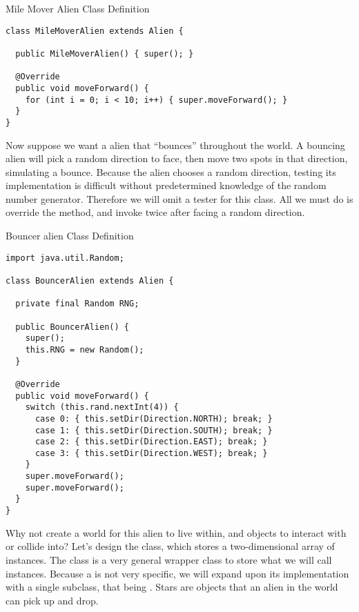 \begin{cl}{Mile Mover Alien Class Definition}
\begin{lstlisting}[language=MyJava]
class MileMoverAlien extends Alien {

  public MileMoverAlien() { super(); }

  @Override
  public void moveForward() {
    for (int i = 0; i < 10; i++) { super.moveForward(); }
  }
}
\end{lstlisting}
\end{cl}

Now suppose we want a alien that ``bounces'' throughout the world. A bouncing alien will pick a random direction to face, then move two spots in that direction, simulating a bounce. Because the alien chooses a random direction, testing its implementation is difficult without predetermined knowledge of the random number generator. Therefore we will omit a tester for this class. All we must do is override the  method, and invoke  twice after facing a random direction.

\begin{cl}{Bouncer alien Class Definition}
\begin{lstlisting}[language=MyJava]
import java.util.Random;

class BouncerAlien extends Alien {

  private final Random RNG;

  public BouncerAlien() {
    super();
    this.RNG = new Random();
  }

  @Override
  public void moveForward() {
    switch (this.rand.nextInt(4)) {
      case 0: { this.setDir(Direction.NORTH); break; }
      case 1: { this.setDir(Direction.SOUTH); break; }
      case 2: { this.setDir(Direction.EAST); break; }
      case 3: { this.setDir(Direction.WEST); break; }
    }
    super.moveForward();
    super.moveForward();
  }
}
\end{lstlisting}
\end{cl}

Why not create a world for this alien to live within, and objects to interact with or collide into? Let's design the  class, which stores a two-dimensional array of  instances. The  class is a very general wrapper class to store what we will call  instances. Because a  is not very specific, we will expand upon its implementation with a single subclass, that being . Stars are objects that an alien in the world can pick up and drop. 

